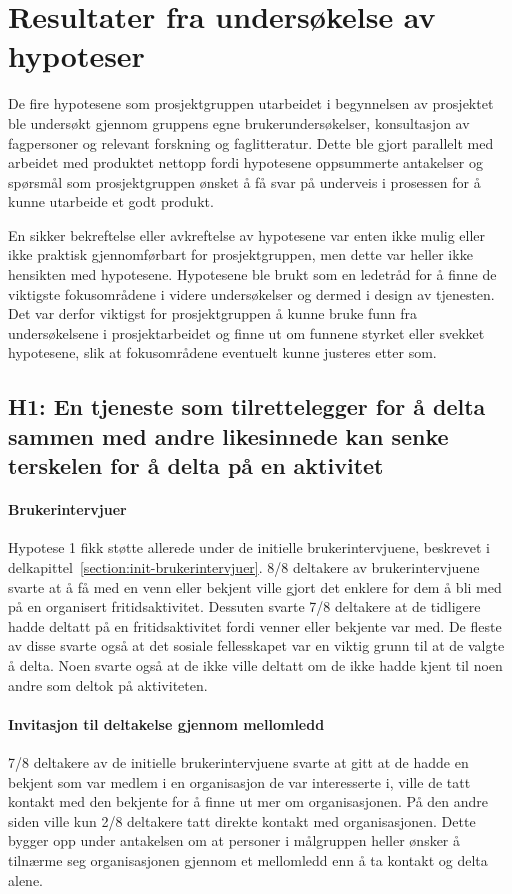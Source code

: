 \section{Resultater fra undersøkelse av hypoteser}
De fire hypotesene som prosjektgruppen utarbeidet i begynnelsen av prosjektet ble undersøkt gjennom gruppens egne brukerundersøkelser, konsultasjon av fagpersoner og relevant forskning og faglitteratur. Dette ble gjort parallelt med arbeidet med produktet nettopp fordi hypotesene oppsummerte antakelser og spørsmål som prosjektgruppen ønsket å få svar på underveis i prosessen for å kunne utarbeide et godt produkt.

En sikker bekreftelse eller avkreftelse av hypotesene var enten ikke mulig eller ikke praktisk gjennomførbart for prosjektgruppen, men dette var heller ikke hensikten med hypotesene. Hypotesene ble brukt som en ledetråd for å finne de viktigste fokusområdene i videre undersøkelser og dermed i design av tjenesten. Det var derfor viktigst for prosjektgruppen å kunne bruke funn fra undersøkelsene i prosjektarbeidet og finne ut om funnene styrket eller svekket hypotesene, slik at fokusområdene eventuelt kunne justeres etter som.

\subsection{H1: En tjeneste som tilrettelegger for å delta sammen med andre likesinnede kan senke terskelen for å delta på en aktivitet}

\paragraph{Brukerintervjuer}
Hypotese 1 fikk støtte allerede under de initielle brukerintervjuene, beskrevet i delkapittel~\ref{section:init-brukerintervjuer}. 8/8 deltakere av brukerintervjuene svarte at å få med en venn eller bekjent ville gjort det enklere for dem å bli med på en organisert fritidsaktivitet. Dessuten svarte 7/8 deltakere at de tidligere hadde deltatt på en fritidsaktivitet fordi venner eller bekjente var med. De fleste av disse svarte også at det sosiale fellesskapet var en viktig grunn til at de valgte å delta. Noen svarte også at de ikke ville deltatt om de ikke hadde kjent til noen andre som deltok på aktiviteten.

\paragraph{Invitasjon til deltakelse gjennom mellomledd}
7/8 deltakere av de initielle brukerintervjuene svarte at gitt at de hadde en bekjent som var medlem i en organisasjon de var interesserte i, ville de tatt kontakt med den bekjente for å finne ut mer om organisasjonen. På den andre siden ville kun 2/8 deltakere tatt direkte kontakt med organisasjonen. Dette bygger opp under antakelsen om at personer i målgruppen heller ønsker å tilnærme seg organisasjonen gjennom et mellomledd enn å ta kontakt og delta alene. 

